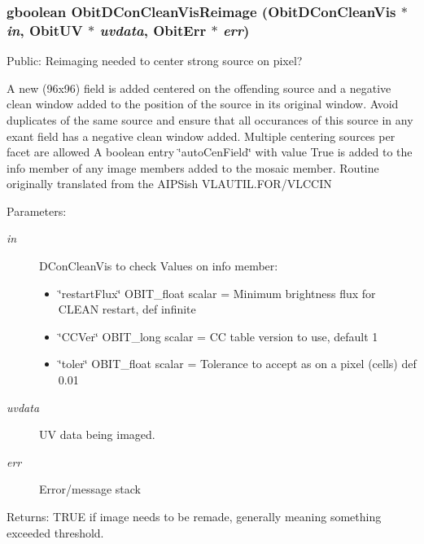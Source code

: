 \subsubsection{\setlength{\rightskip}{0pt plus 5cm}gboolean Obit\-DCon\-Clean\-Vis\-Reimage ({\bf Obit\-DCon\-Clean\-Vis} $\ast$ {\em in}, {\bf Obit\-UV} $\ast$ {\em uvdata}, {\bf Obit\-Err} $\ast$ {\em err})}\label{ObitDConCleanVis_8c_a24}


Public: Reimaging needed to center strong source on pixel? 

A new (96x96) field is added centered on the offending source and a negative clean window added to the position of the source in its original window. Avoid duplicates of the same source and ensure that all occurances of this source in any exant field has a negative clean window added. Multiple centering sources per facet are allowed A boolean entry \char`\"{}auto\-Cen\-Field\char`\"{} with value True is added to the info member of any image members added to the mosaic member. Routine originally translated from the AIPSish VLAUTIL.FOR/VLCCIN \begin{Desc}
\item[Parameters:]
\begin{description}
\item[{\em in}]DCon\-Clean\-Vis to check Values on info member: \begin{itemize}
\item \char`\"{}restart\-Flux\char`\"{} OBIT\_\-float scalar = Minimum brightness flux for CLEAN restart, def infinite \item \char`\"{}CCVer\char`\"{} OBIT\_\-long scalar = CC table version to use, default 1 \item \char`\"{}toler\char`\"{} OBIT\_\-float scalar = Tolerance to accept as on a pixel (cells) def 0.01 \end{itemize}
\item[{\em uvdata}]UV data being imaged. \item[{\em err}]Error/message stack \end{description}
\end{Desc}
\begin{Desc}
\item[Returns:]TRUE if image needs to be remade, generally meaning something exceeded threshold. \end{Desc}
